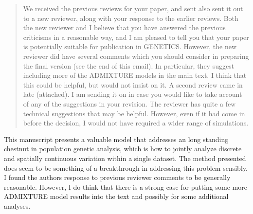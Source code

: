 \newpage


\begin{quote}
    We received the previous reviews for your paper, and sent also sent it out
    to a new reviewer, along with your response to the earlier reviews. Both the
    new reviewer and I believe that you have answered the previous criticisms in a
    reasonable way, and I am pleased to tell you that your paper is potentially
    suitable for publication in GENETICS. However, the new reviewer did have
    several comments which you should consider in preparing the final version (see
    the end of this email). In particular, they suggest including more of the
    ADMIXTURE models in the main text. I think that this could be helpful, but
    would not insist on it.  A second review came in late (attached).  I am sending
    it on in case you would like to take account of any of the suggestions in your
    revision. The reviewer has quite a few technical suggestions that may be
    helpful.  However, even if it had come in before the decision, I would not have
    required a wider range of simulations.  
\end{quote}


\begin{point}{}
    This manuscript presents a valuable model that addresses an long standing chestnut in population genetic analysis, which is how to jointly analyze discrete and spatially continuous variation within a single dataset.  The method presented does seem to be something of a breakthrough in addressing this problem sensibly.  I found the authors response to previous reviewer comments to be generally reasonable. However, I do think that there is a strong case for putting some more ADMIXTURE model results into the text and possibly for some additional analyses.
\end{point}


